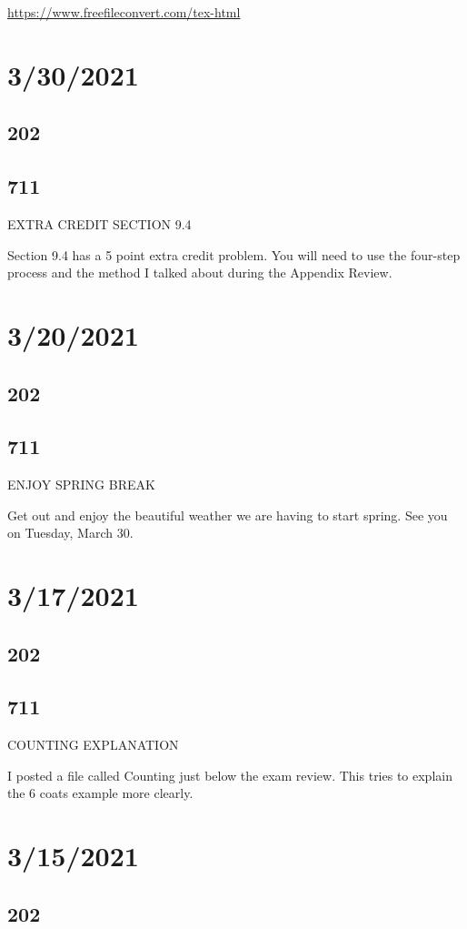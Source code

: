\documentclass[]{article}
\begin{document}
	
\url{https://www.freefileconvert.com/tex-html}

\section*{3/30/2021}
\subsection*{202}
\subsection*{711}
EXTRA CREDIT SECTION 9.4

Section 9.4 has a 5 point extra credit problem. You will need to use the four-step process and the method I talked about during the Appendix Review.

\section*{3/20/2021}
\subsection*{202}
\subsection*{711}
ENJOY SPRING BREAK

Get out and enjoy the beautiful weather we are having to start spring. See you on Tuesday, March 30.

\section*{3/17/2021}
\subsection*{202}
\subsection*{711}
COUNTING EXPLANATION

I posted a file called Counting just below the exam review. This tries to explain the 6 coats example more clearly.

\section*{3/15/2021}
\subsection*{202}
\end{document}
